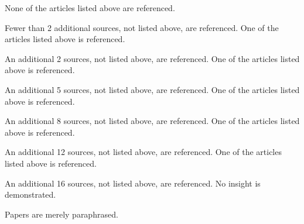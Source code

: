 \documentclass{../../fal_assignment}
\begin{document}
\begin{markingrubric}
%
%
%
%
        \grade\fail	None of the articles listed above are referenced.
        \par		Fewer than 2 additional sources, not listed above, are referenced.
        \grade		One of the articles listed above is referenced.
        \par		An additional 2 sources, not listed above, are referenced.
        \grade		One of the articles listed above is referenced.
        \par		An additional 5 sources, not listed above, are referenced.
        \grade		One of the articles listed above is referenced.
        \par		An additional 8 sources, not listed above, are referenced.
        \grade		One of the articles listed above is referenced.
        \par		An additional 12 sources, not listed above, are referenced.
        \grade		One of the articles listed above is referenced.
        \par		An additional 16 sources, not listed above, are referenced.
%
        \grade\fail No insight is demonstrated.
        \par		Papers are merely paraphrased.

\end{markingrubric}
\end{document}
